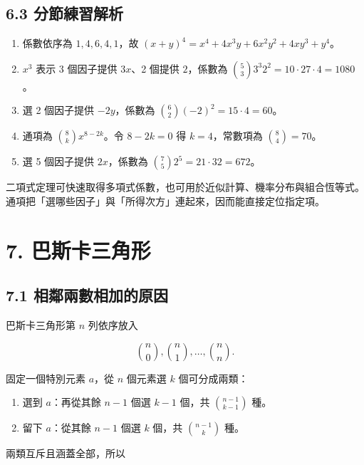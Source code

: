 \documentclass[11pt,a4paper]{article}
\providecommand{\tightlist}{%
  \setlength{\itemsep}{0pt}\setlength{\parskip}{0pt}}
\begin{document}
\subsection{6.3 分節練習解析}\label{ux5206ux7bc0ux7df4ux7fd2ux89e3ux6790-5}

\begin{enumerate}
\def\labelenumi{\arabic{enumi}.}
\tightlist
\item
  係數依序為 \(1,4,6,4,1\)，故 \((x+y)^4=x^4+4x^3y+6x^2y^2+4xy^3+y^4\)。
\item
  \(x^3\) 表示 3 個因子提供 \(3x\)、2 個提供 \(2\)，係數為 \(\binom53 3^3 2^2=10\cdot27\cdot4=1080\)。
\item
  選 2 個因子提供 \(-2y\)，係數為 \(\binom62(-2)^2=15\cdot4=60\)。
\item
  通項為 \(\binom8k x^{8-2k}\)。令 \(8-2k=0\) 得 \(k=4\)，常數項為 \(\binom84=70\)。
\item
  選 5 個因子提供 \(2x\)，係數為 \(\binom75 2^5=21\cdot32=672\)。
\end{enumerate}

二項式定理可快速取得多項式係數，也可用於近似計算、機率分布與組合恆等式。通項把「選哪些因子」與「所得次方」連起來，因而能直接定位指定項。

\section{7. 巴斯卡三角形}\label{ux5df4ux65afux5361ux4e09ux89d2ux5f62}

\subsection{7.1 相鄰兩數相加的原因}\label{ux76f8ux9130ux5169ux6578ux76f8ux52a0ux7684ux539fux56e0}

巴斯卡三角形第 \(n\) 列依序放入

\[
\binom n0,\binom n1,\ldots,\binom nn.
\]

固定一個特別元素 \(a\)，從 \(n\) 個元素選 \(k\) 個可分成兩類：

\begin{enumerate}
\def\labelenumi{\arabic{enumi}.}
\tightlist
\item
  選到 \(a\)：再從其餘 \(n-1\) 個選 \(k-1\) 個，共 \(\binom{n-1}{k-1}\) 種。
\item
  留下 \(a\)：從其餘 \(n-1\) 個選 \(k\) 個，共 \(\binom{n-1}{k}\) 種。
\end{enumerate}

兩類互斥且涵蓋全部，所以
\end{document}
